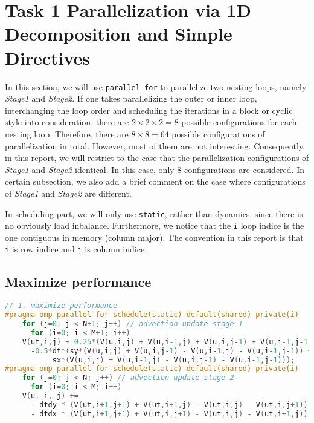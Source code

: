 \section{Task 1 Parallelization via 1D Decomposition and Simple Directives}

In this section, we will use \lstinline{parallel for} to parallelize two nesting loops, namely \textit{Stage1} and \textit{Stage2}.
If one takes parallelizing the outer or inner loop, interchanging the loop order and scheduling the iterations in a block or cyclic style into consideration,
there are $2\times2\times2=8$ possible configurations for each nesting loop. 
Therefore, there are $8\times8=64$ possible configurations of parallelization in total. 
However, most of them are not interesting.
Consequently, in this report, we will restrict to the case that the parallelization configurations of \textit{Stage1} and \textit{Stage2} identical.
In this case, only 8 configurations are considered. 
In certain subsection, we also add a brief comment on the case where configurations of \textit{Stage1} and \textit{Stage2} are different.

In scheduling part, we will only use \lstinline{static}, rather than dynamics,
since there is no obviously load inbalance. 
Furthermore, we notice that the \lstinline{i} loop indice is the one contiguous in memory (column major).
The convention in this report is that \lstinline{i} is row indice and \lstinline{j} is column indice.

\subsection{Maximize performance}

\begin{lstlisting}[language=c]
// 1. maximize performance
#pragma omp parallel for schedule(static) default(shared) private(i)
    for (j=0; j < N+1; j++) // advection update stage 1
      for (i=0; i < M+1; i++) 
	V(ut,i,j) = 0.25*(V(u,i,j) + V(u,i-1,j) + V(u,i,j-1) + V(u,i-1,j-1))
	  -0.5*dt*(sy*(V(u,i,j) + V(u,i,j-1) - V(u,i-1,j) - V(u,i-1,j-1)) +
		   sx*(V(u,i,j) + V(u,i-1,j) - V(u,i,j-1) - V(u,i-1,j-1)));
#pragma omp parallel for schedule(static) default(shared) private(i)
    for (j=0; j < N; j++) // advection update stage 2
      for (i=0; i < M; i++) 
	V(u, i, j) +=
	  - dtdy * (V(ut,i+1,j+1) + V(ut,i+1,j) - V(ut,i,j) - V(ut,i,j+1))
	  - dtdx * (V(ut,i+1,j+1) + V(ut,i,j+1) - V(ut,i,j) - V(ut,i+1,j));
\end{lstlisting}

